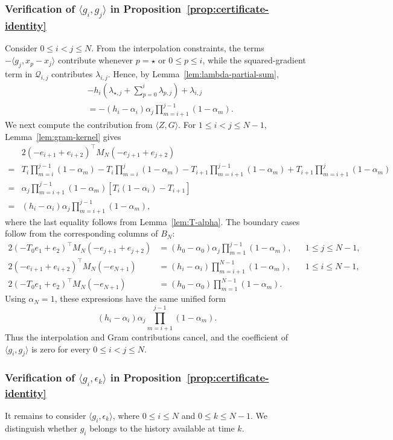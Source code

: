 \subsubsection{Verification of $\langle g_i,g_j\rangle$ in Proposition~\ref{prop:certificate-identity}}
Consider $0\le i<j\le N$. From the interpolation constraints, the terms $-\langle g_j,x_p-x_j\rangle$ contribute whenever $p=\star$ or $0\le p\le i$, while the squared-gradient term in $\mathcal Q_{i,j}$ contributes $\lambda_{i,j}$. Hence, by Lemma~\ref{lem:lambda-partial-sum},
\[\begin{aligned}
&-h_i\left(\lambda_{\star,j}+\sum_{p=0}^{i}\lambda_{p,j}\right)+\lambda_{i,j}\\
&=-(h_i-\alpha_i)\alpha_j\prod_{m=i+1}^{j-1}(1-\alpha_m).
\end{aligned}\]
We next compute the contribution from $\langle Z,G\rangle$. For $1\le i<j\le N-1$, Lemma~\ref{lem:gram-kernel} gives
\[ \begin{aligned}
&2(-e_{i+1}+e_{i+2})^\top M_N(-e_{j+1}+e_{j+2})\\
={}&T_i\prod_{m=i}^{j-1}(1-\alpha_m)-T_i\prod_{m=i}^{j}(1-\alpha_m)
-T_{i+1}\prod_{m=i+1}^{j-1}(1-\alpha_m)+T_{i+1}\prod_{m=i+1}^{j}(1-\alpha_m)\\
={}&\alpha_j\prod_{m=i+1}^{j-1}(1-\alpha_m)\left[T_i(1-\alpha_i)-T_{i+1}\right]\\
={}&(h_i-\alpha_i)\alpha_j\prod_{m=i+1}^{j-1}(1-\alpha_m),
\end{aligned} \]
where the last equality follows from Lemma~\ref{lem:T-alpha}. The boundary cases follow from the corresponding columns of $B_N$:
\[ \begin{aligned}
2(-T_0e_1+e_2)^\top M_N(-e_{j+1}+e_{j+2})
&=(h_0-\alpha_0)\alpha_j\prod_{m=1}^{j-1}(1-\alpha_m), &&1\le j\le N-1,\\
2(-e_{i+1}+e_{i+2})^\top M_N(-e_{N+1})
&=(h_i-\alpha_i)\prod_{m=i+1}^{N-1}(1-\alpha_m), &&1\le i\le N-1,\\
2(-T_0e_1+e_2)^\top M_N(-e_{N+1})
&=(h_0-\alpha_0)\prod_{m=1}^{N-1}(1-\alpha_m).
\end{aligned} \]
Using $\alpha_N=1$, these expressions have the same unified form
\[ (h_i-\alpha_i)\alpha_j\prod_{m=i+1}^{j-1}(1-\alpha_m). \]
Thus the interpolation and Gram contributions cancel, and the coefficient of $\langle g_i,g_j\rangle$ is zero for every $0\le i<j\le N$.
\subsubsection{Verification of $\langle g_i,\epsilon_k\rangle$ in Proposition~\ref{prop:certificate-identity}}
It remains to consider $\langle g_i,\epsilon_k\rangle$, where $0\le i\le N$ and $0\le k\le N-1$. We distinguish whether $g_i$ belongs to the history available at time $k$.


